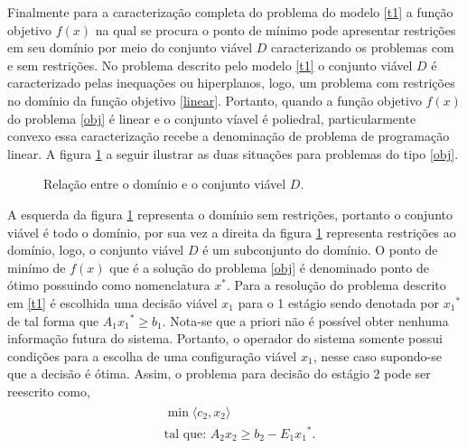   Finalmente para a caracteriza\c c\~ao completa do problema do modelo \ref{t1} a fun\c c\~ao objetivo $f(x)$ na qual se
  procura o ponto de m\'inimo pode apresentar restri\c c\~oes em seu dom\'inio por meio do conjunto vi\'avel $D$
  caracterizando os problemas com e sem restri\c c\~oes.  No problema descrito pelo modelo \ref{t1} o conjunto vi\'avel
  $D$ \'e caracterizado pelas inequa\c c\~oes ou hiperplanos, logo, um problema com restri\c c\~oes no dom\'inio da fun\c c\~ao
  objetivo \ref{linear}. Portanto, quando a fun\c c\~ao objetivo $f(x)$ do problema \ref{obj} \'e linear e o conjunto
  v\'iavel \'e poliedral, particularmente convexo essa caracteriza\c c\~ao recebe a denomina\c c\~ao de problema de
  programa\c c\~ao linear. A figura \ref{via} a seguir ilustrar as duas situa\c c\~oes para problemas do tipo \ref{obj}.

  \begin{figure}[!h]%
		\centering
		\resizebox{0.7\width}{!}{
		 
  	}
	\resizebox{0.7\width}{!}{
		 
  	}
		\caption{Rela\c c\~ao entre o dom\'inio e o conjunto vi\'avel $D$.}
		\label{via}
  	\end{figure}

	A esquerda da figura \ref{via} representa o dom\'inio sem restri\c c\~oes, portanto o conjunto vi\'avel \'e todo o
	dom\'inio, por sua vez a direita da figura \ref{via} representa restri\c c\~oes ao dom\'inio, logo, o conjunto
	vi\'avel $D$ \'e um subconjunto do dom\'inio.  
O ponto de min\'imo de $f(x)$ que \'e a solu\c c\~ao do problema \ref{obj} \'e denominado ponto de \'otimo possuindo
como nomenclatura $x^{*}$. 
Para a  resolu\c c\~ao  do problema descrito em \ref{t1} \'e
escolhida uma decis\~ao vi\'avel $x_1$ para o 1 est\'agio sendo denotada por ${x_1}^{*}$ de tal forma que $A_1{x_1}^{*} \geq b_1$.
Nota-se que a priori n\~ao \'e poss\'ivel obter nenhuma informa\c c\~ao futura do sistema. Portanto, o operador do sistema
somente possui condi\c c\~oes para a escolha de uma configura\c c\~ao vi\'avel $x_1$, nesse caso supondo-se que a decis\~ao
\'e \'otima. 
Assim, o problema para decis\~ao do est\'agio 2 pode ser reescrito como, 
\begin{align}
  \begin{split}	
 & 	\min \langle c_2,x_2\rangle  \\
&\mbox{tal que: }A_2 x_2 \geq b_2 -{E_1 x_1}^{*}.
  \end{split}
    \label{p2}
\end{align}

